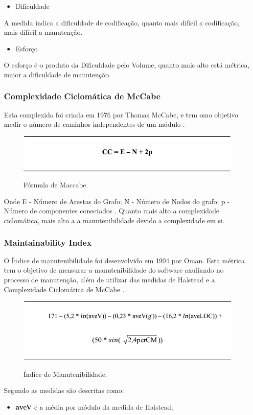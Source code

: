 \begin{itemize}
\item Dificuldade
\end{itemize}
A medida indica a dificuldade de codificação, quanto mais difícil a codificação, mais difícil a manutenção.

\begin{itemize}
\item Esforço
\end{itemize}
O esforço é o produto da Dificuldade pelo Volume, quanto mais alto está métrica, maior a dificuldade de manutenção.

\subsubsection{Complexidade Ciclomática de McCabe}
Esta complexida foi criada em 1976  por Thomas McCabe, e tem omo objetivo medir o número de caminhos independentes de um módulo \cite{isaias2012}.

\begin{figure}[h]
\centering
\caption[Fórmula de Maccabe.]{Fórmula de Maccabe.}
\includegraphics[width=0.7\linewidth]{./images/maccabe}
\label{fig:maccabe}
\end{figure}
Onde E - Número de Arestas do Grafo; N - Número de Nodos do grafo; p - Número de componentes conectados \cite{isaias2012}. Quanto mais alto a complexidade ciclomática, mais alto a a manutenibilidade devido a complexidade em si.

\subsubsection{Maintainability Index } \label{MI}
O Índice de manutenibilidade foi desenvolvido em 1994 por Oman. Esta métrica tem o objetivo de mensurar a manutenibilidade do software axuliando no processo de manutenção, além de utilizar das medidas de Halstead e a Complexidade Ciclomática de McCabe \cite{isaias2012}.
\begin{figure}[h]
\centering
\caption[Índice de Manutenibilidade.]{Índice de Manutenibilidade.}
\includegraphics[width=0.7\linewidth]{./images/MI}
\label{fig:MI}
\end{figure}
Segundo  as medidas são descritas como:
\begin{itemize}
 \item \textbf{aveV} é a média por módulo da medida de Halstead;
\end{itemize}

